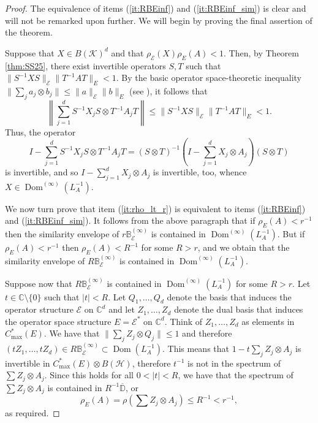\documentclass[12pt]{amsart}
\numberwithin{equation}{section}
\theoremstyle{definition}
\newcommand{\cE}{\mathcal{E}}
\newcommand{\cH}{\mathcal{H}}
\newcommand{\cK}{\mathcal{K}}
\newcommand{\bB}{\mathbb{B}}
\newcommand{\bC}{\mathbb{C}}
\newcommand{\bD}{\mathbb{D}}
\newcommand{\ol}{\overline}
\newcommand{\dom}{\operatorname{Dom}}
\begin{document}
\begin{proof}
    The equivalence of items (\ref{it:RBEinf}) and (\ref{it:RBEinf_sim}) is clear and will not be remarked upon further. We will begin by proving the final assertion of the theorem.
    
    Suppose that $X \in B(\cK)^d$ and that $\rho_\cE(X) \rho_E(A) < 1$. 
    Then, by Theorem \ref{thm:SS25}, there exist invertible operators $S,T$ such that $\|S^{-1} X S\|_{\cE} \|T^{-1}AT\|_E < 1$. 
    By the basic operator space-theoretic inequality $\|\sum_j a_j \otimes b_j \| \leq \|a\|_\cE \|b\|_E$ (see \cite[Equation (2.11.2)]{PisierBook}), it follows that 
    \[
    \left\|\sum_{j=1}^d S^{-1} X_j S \otimes T^{-1}A_jT \right\| \leq \|S^{-1} X S\|_{\cE} \|T^{-1}AT\|_E < 1 .
    \]
    Thus, the operator 
    \[
    I - \sum_{j=1}^d S^{-1} X_j S \otimes T^{-1}A_jT = (S \otimes T)^{-1} \left(I - \sum_{j=1}^d X_j \otimes A_j \right)(S \otimes T)
    \]
    is invertible, and so $I - \sum_{j=1}^d X_j \otimes A_j$ is invertible, too, whence $X \in \dom^{(\infty)}(L^{-1}_A)$. 
    
    We now turn prove that item (\ref{it:rho_lt_r}) is equivalent to items (\ref{it:RBEinf}) and (\ref{it:RBEinf_sim}). 
    It follows from the above paragraph that if $\rho_E(A) < r^{-1}$ then the similarity envelope of ${r\bB_\cE^{(\infty)}}$ is contained in $\dom^{(\infty)}(L^{-1}_A)$. 
    But if $\rho_E(A) < r^{-1}$ then $\rho_E(A) < R^{-1}$ for some $R > r$, and we obtain that the similarity envelope of ${R\bB_\cE^{(\infty)}}$ is contained in $\dom^{(\infty)}(L^{-1}_A)$. 

    Suppose now that $R\bB_\cE^{(\infty)}$ is contained in $\dom^{(\infty)}(L^{-1}_A)$ for some $R > r$. 
    Let $t \in \bC\setminus \{0\}$ such that $|t| < R$. 
    Let $Q_1, \ldots, Q_d$ denote the basis that induces the operator structure $\cE$ on $\bC^d$ and let $Z_1, \ldots, Z_d$ denote the dual basis that induces the operator space structure $E = \cE^*$ on $\bC^d$. 
    Think of $Z_1, \ldots, Z_d$ as elements in $C^*_{\max}(E)$.
    We have that $\|\sum_j Z_j \otimes Q_j\| \leq 1$ and therefore $(t Z_1, \ldots, tZ_d) \in R\bB_\cE^{(\infty)} \subset \dom(L^{-1}_A)$. 
    This means that $1 - t \sum_j Z_j \otimes A_j$ is invertible in $C^*_{\max}(E) \otimes B(\cH)$, therefore $t^{-1}$ is not in the spectrum of $\sum Z_j \otimes A_j$.  
    Since this holds for all $0<|t|<R$, we have that the spectrum of $\sum Z_j \otimes A_j$ is contained in $R^{-1}\ol{\bD}$, or
    \[
    \rho_E(A) = \rho\left(\sum Z_j \otimes A_j\right) \leq R^{-1} < r^{-1}, 
    \]
    as required. 
    

\end{proof}
\end{document}
